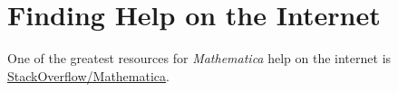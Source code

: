 \appendix
\chapter{Finding Help on the Internet}

One of the greatest resources for \emph{Mathematica} help on the internet is \href{http://stackoverflow.com/questions/tagged/mathematica}{StackOverflow/Mathematica}.
